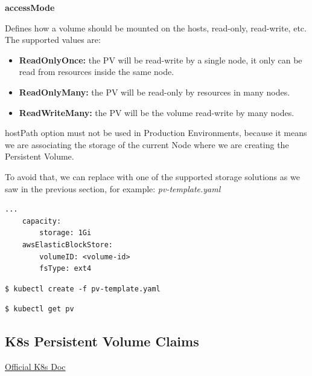 \documentclass{article}
\newenvironment{blocktemplateIII}[1]{%
    \tcolorbox[beamer,%
    noparskip,breakable,
    ,colframe=Red,%
    colbacklower=LimeGreen!75!LightGreen,%
    title=#1]}%
    {\endtcolorbox}
\newenvironment{codetemplate}[1][]{%
  \mybasecolorbox[#1]
  \itshape
}{%
  \endmybasecolorbox
}
\begin{document}
\textbf{accessMode}

Defines how a volume should be mounted on the hosts, read-only, read-write, etc. The supported values are:
\begin{itemize}
    \item \textbf{ReadOnlyOnce:} the PV will be read-write by a single node, it only can be read from resources inside the same node.
    \item \textbf{ReadOnlyMany:} the PV will be read-only by resources in many nodes.
    \item \textbf{ReadWriteMany:} the PV will be the volume read-write by many nodes.
\end{itemize}

\begin{blocktemplateIII}{WARNING}
hostPath option must not be used in Production Environments, because it means we are associating the storage of the current Node where we are creating the Persistent Volume.

To avoid that, we can replace with one of the supported storage solutions as we saw in the previous section, for example:
\begin{codetemplate}{pv-template.yaml}
\begin{verbatim}
...
    capacity:
        storage: 1Gi
    awsElasticBlockStore:
        volumeID: <volume-id>
        fsType: ext4
\end{verbatim}
\end{codetemplate}

\end{blocktemplateIII}

\begin{codetemplate}{}
\begin{verbatim}
$ kubectl create -f pv-template.yaml
\end{verbatim}
\end{codetemplate}

\begin{codetemplate}{}
\begin{verbatim}
$ kubectl get pv
\end{verbatim}
\end{codetemplate}

\subsection{K8s Persistent Volume Claims}

\href{https://kubernetes.io/docs/concepts/storage/persistent-volumes/#persistentvolumeclaims}{Official K8s Doc}
\end{document}
